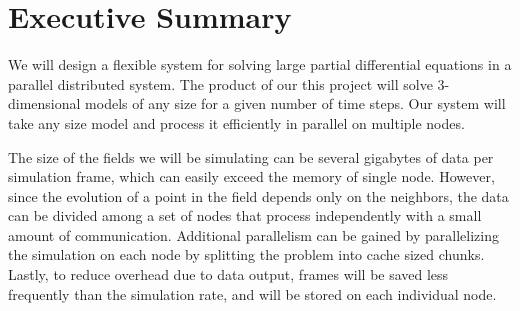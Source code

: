 \section*{Executive Summary}
We will design a flexible system for solving large partial differential equations in a parallel distributed system.  The product of our this project will solve 3-dimensional models of any size for a given number of time steps.  Our system will take any size model and process it efficiently in parallel on multiple nodes.

The size of the fields we will be simulating can be several gigabytes of data per simulation frame, which can easily exceed the memory of single node. However, since the evolution of a point in the field depends only on the neighbors, the data can be divided among a set of nodes that process independently with a small amount of communication. Additional parallelism can be gained by parallelizing the simulation on each node by splitting the problem into cache sized chunks. Lastly, to reduce overhead due to data output, frames will be saved less frequently than the simulation rate, and will be stored on each individual node.


